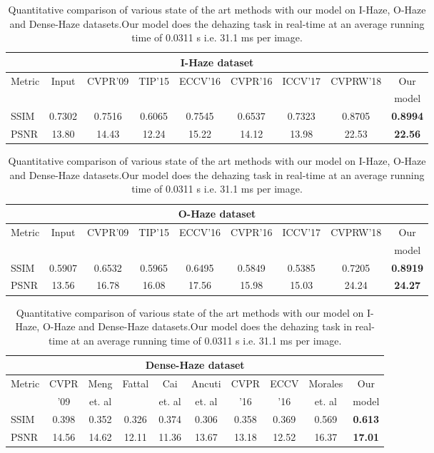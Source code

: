 \documentclass[runningheads]{llncs}
\begin{document}
\begin{table}[t]
\centering
\caption{Quantitative comparison of various state of the art methods with our model on I-Haze, O-Haze and Dense-Haze datasets.Our model does the dehazing task in real-time at an average running time of 0.0311 s i.e. 31.1 ms per image.}
\label{tbl:indoor_outdoor_table}
\begin{tabular}{|l||c|c|c|c|c|c|c|c|}
    \hline
    \multicolumn{9}{|c|}{I-Haze dataset}\\
    \hline
    Metric & Input & CVPR'09 & TIP'15 & ECCV'16 & CVPR'16 & ICCV'17 & CVPRW'18 & Our\\
    & & \cite{he2010single}& \cite{zhu2015fast}& \cite{ren2016single}& \cite{berman2016non}& \cite{li2017all}& \cite{zhang2018multi}& model\\
    \hline
    SSIM  & 0.7302 & 0.7516 & 0.6065 & 0.7545 & 0.6537 & 0.7323 & 0.8705 & \textbf{0.8994}\\
    \hline
    PSNR & 13.80 & 14.43 & 12.24 & 15.22 & 14.12 & 13.98 & 22.53 & \textbf{22.56}\\
    \hline
\end{tabular}
\begin{tabular}{|l||c|c|c|c|c|c|c|c|}
    \hline
    \multicolumn{9}{|c|}{O-Haze dataset}\\
    \hline
    Metric & Input & CVPR'09 & TIP'15 & ECCV'16 & CVPR'16 & ICCV'17 & CVPRW'18 & Our\\
    & & \cite{he2010single}& \cite{zhu2015fast}& \cite{ren2016single}& \cite{berman2016non}& \cite{li2017all}& \cite{zhang2018multi}& model\\
    \hline
    SSIM  & 0.5907 & 0.6532 & 0.5965 & 0.6495 & 0.5849 & 0.5385 & 0.7205 & \textbf{0.8919}\\
    \hline
    PSNR & 13.56 & 16.78 & 16.08 & 17.56 & 15.98 & 15.03 & 24.24 & \textbf{24.27}\\
    \hline
\end{tabular}
\begin{tabular}{|l||c|c|c|c|c|c|c|c|c|}
    \hline
    \multicolumn{10}{|c|}{Dense-Haze dataset}\\
    \hline
    Metric & CVPR & Meng & Fattal & Cai & Ancuti & CVPR & ECCV & Morales & Our\\
    & '09 \cite{he2010single} & et. al \cite{meng2013efficient} & \cite{fattal3dehazing} & et. al \cite{cai2016dehazenet} & et. al \cite{ancuti2016night} & '16 \cite{berman2016non} & '16 \cite{ren2016single} & et. al \cite{morales2019feature} & model\\
    \hline
    SSIM  & 0.398 & 0.352 & 0.326 & 0.374 & 0.306 & 0.358 & 0.369 & 0.569 & \textbf{0.613}\\
    \hline
    PSNR & 14.56 & 14.62 & 12.11 & 11.36 & 13.67 & 13.18 & 12.52 & 16.37 & \textbf{17.01}\\
    \hline
\end{tabular}
\end{table}
\end{document}
